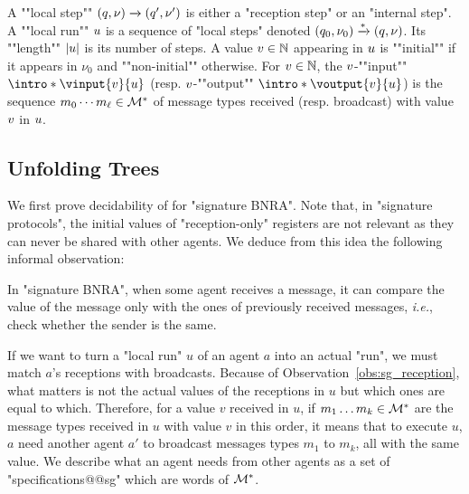 	\AP A ""local step"" $(q,\nu) \xrightarrow{} (q',\nu')$ is either a "reception step" or an "internal step". 
	\AP A ""local run"" $u$ is a sequence of "local steps" denoted $(q_0, \nu_0) \xrightarrow{*} (q, \nu)$. Its ""length"" $|u|$ is its number of steps. %
	A value $v \in \mathbb{N}$ appearing in $u$ is ""initial"" if it appears in $\nu_0$ and ""non-initial"" otherwise. 
	For $v \in \mathbb{N}$, the $v$-""input"" $\intro*\vinput{\aval}{\localrun}$ (resp. $v$-""output"" $\intro*\voutput{\aval}{\localrun}$) is the sequence $m_0 \cdots m_{\ell} \in \mathcal{M}^*$ of message types received (resp. broadcast) with value $v$ in $u$.

\subsection{Unfolding Trees}
\label{sec:unfolding_tree_signature}

We first prove decidability of \COVER for "signature BNRA". Note that, in "signature protocols", the initial values of "reception-only" registers are not relevant as they can never be shared with other agents. We deduce from this idea the following informal observation:
\begin{observation}
\label{obs:sg_reception} 
In "signature BNRA", when some agent receives a message, it can compare the value of the message only with the ones of previously received messages, \emph{i.e.}, check whether the sender is the same.
\end{observation}

If we want to turn a "local run" $u$ of an agent $a$ into an actual "run", we must match $a$'s receptions with broadcasts. Because of Observation~\ref{obs:sg_reception}, what matters is not the actual values of the receptions in $u$ but which ones are equal to which.  Therefore, for a value $v$ received in $u$, if $m_1 \dots m_k \in \mathcal{M}^*$ are the message types received in $u$ with value $v$ in this order, it means that to execute $u$, $a$ need another agent $a'$ to broadcast messages types $m_1$ to $m_k$, all with the same value.  
We describe what an agent needs from other agents as a set of "specifications@@sg" which are words of $\mathcal{M}^*$. 

